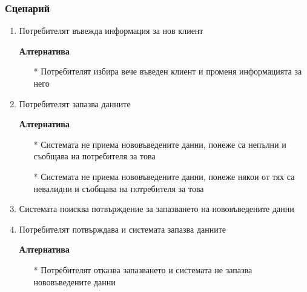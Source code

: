 \begin{frame}
  \frametitle{Сценарий}
  \begin{enumerate}
      \item{Потребителят въвежда информация за нов клиент

      \textbf{Алтернатива}
      \begin{enumerate}
	\item[*]{Потребителят избира вече въведен клиент и променя информацията за него
	  }
      \end{enumerate}
      }
      \item{Потребителят запазва данните

      \textbf{Алтернатива}
      \begin{enumerate}
	\item[*]{Системата не приема нововъведените данни, понеже са непълни и съобщава на потребителя за това
	  }
	\item[*]{Системата не приема нововъведените данни, понеже някои от тях са невалидни и съобщава на потребителя за това
	  }
      \end{enumerate}
      }
      \item{Системата поисква потвърждение за запазването на нововъведените данни
      }
      \item{Потребителят потвърждава и системата запазва данните

      \textbf{Алтернатива}
      \begin{enumerate}
	\item[*]{Потребителят отказва запазването и системата не запазва нововъведените данни}
      \end{enumerate}
      }
  \end{enumerate}

\end{frame}

